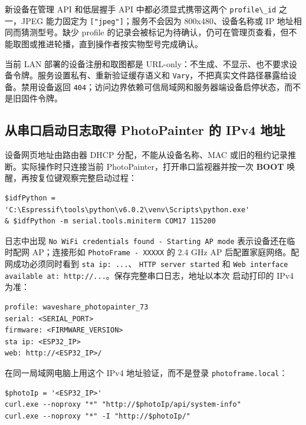 新设备在管理 API 和低层握手 API 中都必须显式携带这两个
\passthrough{\lstinline!profile\_id!} 之一，JPEG 能力固定为
\passthrough{\lstinline!["jpeg"]!}；服务不会因为 800x480、设备名称或 IP
地址相同而猜测型号。缺少 profile
的记录会被标记为待确认，仍可在管理页查看，但不能取图或推进轮播，直到操作者按实物型号完成确认。

当前 LAN 部署的设备注册和取图都是
URL-only：不生成、不显示、也不要求设备令牌。服务设置私有、重新验证缓存语义和
\passthrough{\lstinline!Vary!}，不把真实文件路径暴露给设备。禁用设备返回
\passthrough{\lstinline!404!}；访问边界依赖可信局域网和服务器端设备启停状态，而不是旧固件令牌。

\subsection{从串口启动日志取得 PhotoPainter 的 IPv4
地址}\label{ux4eceux4e32ux53e3ux542fux52a8ux65e5ux5fd7ux53d6ux5f97-photopainter-ux7684-ipv4-ux5730ux5740}

设备网页地址由路由器 DHCP 分配，不能从设备名称、MAC
或旧的租约记录推断。实际操作时只连接当前
PhotoPainter，打开串口监视器并按一次 \textbf{BOOT}
唤醒，再按复位键观察完整启动过程：

\begin{lstlisting}
$idfPython = 'C:\Espressif\tools\python\v6.0.2\venv\Scripts\python.exe'
& $idfPython -m serial.tools.miniterm COM17 115200
\end{lstlisting}

日志中出现
\passthrough{\lstinline!No WiFi credentials found - Starting AP mode!}
表示设备还在临时配网 AP；连接形如
\passthrough{\lstinline!PhotoFrame - XXXXX!} 的 2.4 GHz AP
后配置家庭网络。配网成功必须同时看到
\passthrough{\lstinline!sta ip: ...!}、
\passthrough{\lstinline!HTTP server started!} 和
\passthrough{\lstinline!Web interface available at: http://...!}。保存完整串口日志，地址以本次
启动打印的 IPv4 为准：

\begin{lstlisting}
profile: waveshare_photopainter_73
serial: <SERIAL_PORT>
firmware: <FIRMWARE_VERSION>
sta ip: <ESP32_IP>
web: http://<ESP32_IP>/
\end{lstlisting}

在同一局域网电脑上用这个 IPv4 地址验证，而不是登录
\passthrough{\lstinline!photoframe.local!}：

\begin{lstlisting}
$photoIp = '<ESP32_IP>'
curl.exe --noproxy "*" "http://$photoIp/api/system-info"
curl.exe --noproxy "*" -I "http://$photoIp/"
\end{lstlisting}

